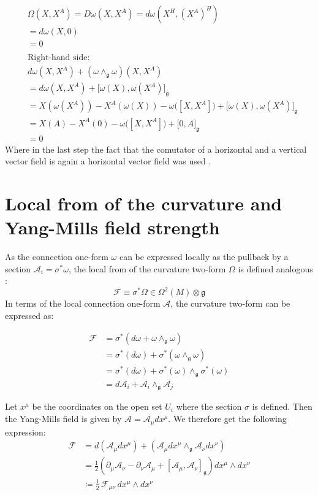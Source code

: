 \begin{align*}
  &\Omega(X,X^A) = D\omega(X,X^A) = d\omega(X^H, (X^A)^H) \\
  &= d\omega(X, 0) \\
  &= 0 \\
  \\ 
  &\text{Right-hand side:} \\
  &d\omega(X,X^A) + (\omega \wedge_{\mathfrak{g}} \omega)(X,X^A) \\
  &= d\omega(X, X^A) + \big[ \omega(X), \omega(X^A) \big]_\mathfrak{g} \\
  &= X(\omega(X^A)) - X^A(\omega(X)) - \omega\big( [X,X^A] \big) + \big[ \omega(X), \omega(X^A) \big]_\mathfrak{g} \\
  &= X(A) - X^A(0) - \omega\big( [X,X^A] \big) + \big[ 0, A \big]_\mathfrak{g} \\
  &= 0
\end{align*}
Where in the last step the fact that the comutator of a horizontal and a vertical vector field is again a horizontal vector field was used \cite{NakaharaGeometrytopologyphysics2005}.


\section{Local from of the curvature and Yang-Mills field strength}

As the connection one-form $\omega$ can be expressed locally as the pullback by a section $\mathcal{A}_i = \sigma^*\omega$, the local from of the curvature two-form $\Omega$ is defined analogous \cite{NakaharaGeometrytopologyphysics2005}:
\[ \mathscr{F} \equiv \sigma^*\Omega \in \Omega^2(M)\otimes\mathfrak{g} \]
In terms of the local connection one-form $\mathcal{A}$, the curvature two-form can be expressed as:

\begin{align*}
  \mathscr{F} &= \sigma^*(d\omega + \omega \wedge_\mathfrak{g} \omega) \\
  &= \sigma^*(d\omega) + \sigma^*(\omega \wedge_\mathfrak{g} \omega) \\
  &= \sigma^*(d\omega) + \sigma^*(\omega) \wedge_\mathfrak{g} \sigma^*(\omega) \\
  &= d\mathcal{A}_i + \mathcal{A}_i \wedge_\mathfrak{g} \mathcal{A}_j
\end{align*}

Let $x^\mu$ be the coordinates on the open set $U_i$ where the section $\sigma$ is defined. Then the Yang-Mills field is given by $\mathcal{A}=\mathcal{A}_\mu dx^\mu$. We therefore get the following expression:
\begin{align*}
  \mathscr{F} &= d(\mathcal{A}_\mu dx^\mu) + (\mathcal{A}_\mu dx^\mu \wedge_\mathfrak{g} \mathcal{A}_\nu dx^\nu) \\
  &= \frac12 \left( \partial_\mu \mathcal{A}_\nu - \partial_\nu \mathcal{A}_\mu + [\mathcal{A}_\mu, \mathcal{A}_\nu]_\mathfrak{g} \right) dx^\mu \wedge dx^\nu \\
  &\coloneq \frac12 \, \mathscr{F}_{\mu\nu} \, dx^\mu \wedge dx^\nu
\end{align*}

